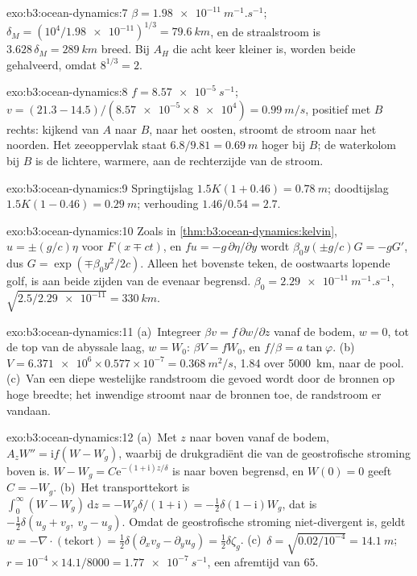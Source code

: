 \begin{solution}{exo:b3:ocean-dynamics:7}
$\beta = \qty{1.98e-11}{m^{-1}.s^{-1}}$; $\delta_M = (10^4/\num{1.98e-11})^{1/3}
= \qty{79.6}{km}$, en de straalstroom is $3.628\,\delta_M = \qty{289}{km}$ breed.
Bij $A_H$ die acht keer kleiner is, worden beide gehalveerd, omdat $8^{1/3} = 2$.
\end{solution}

\begin{solution}{exo:b3:ocean-dynamics:8}
$f = \qty{8.57e-5}{s^{-1}}$; $v = (21.3 - 14.5)/(\num{8.57e-5}\times\num{8e4})
= \qty{0.99}{m/s}$, positief met $B$ rechts: kijkend van $A$ naar $B$,
naar het oosten, stroomt de stroom naar het noorden. Het zeeoppervlak staat
$6.8/9.81 = \qty{0.69}{m}$ hoger bij $B$; de waterkolom bij $B$ is de
lichtere, warmere, aan de rechterzijde van de stroom.
\end{solution}

\begin{solution}{exo:b3:ocean-dynamics:9}
Springtijslag $1.5K(1 + 0.46) = \qty{0.78}{m}$; doodtijslag $1.5K(1 - 0.46)
= \qty{0.29}{m}$; verhouding $1.46/0.54 = 2.7$.
\end{solution}

\begin{solution}{exo:b3:ocean-dynamics:10}
Zoals in \cref{thm:b3:ocean-dynamics:kelvin}, $u = \pm(g/c)\eta$ voor $F(x \mp
ct)$, en $fu = -g\,\partial\eta/\partial y$ wordt $\beta_0y(\pm g/c)G =
-gG'$, dus $G = \exp(\mp\beta_0y^2/2c)$. Alleen het bovenste teken, de
oostwaarts lopende golf, is aan beide zijden van de evenaar begrensd. $\beta_0 =
\qty{2.29e-11}{m^{-1}.s^{-1}}$, $\sqrt{2.5/\num{2.29e-11}} = \qty{330}{km}$.
\end{solution}

\begin{solution}{exo:b3:ocean-dynamics:11}
(a)~Integreer $\beta v = f\,\partial w/\partial z$ vanaf de bodem, $w = 0$,
tot de top van de abyssale laag, $w = W_0$: $\beta V = fW_0$, en $f/\beta =
a\tan\varphi$. (b)~$V = \num{6.371e6}\times0.577\times10^{-7} =
\qty{0.368}{m^2/s}$, \qty{1.84}{\sverdrup} over \qty{5000}{km}, naar de pool.
(c)~Van een diepe westelijke randstroom die gevoed wordt door de bronnen op
hoge breedte; het inwendige stroomt naar de bronnen toe, de randstroom er
vandaan.
\end{solution}

\begin{solution}{exo:b3:ocean-dynamics:12}
(a)~Met $z$ naar boven vanaf de bodem, $A_zW'' = \mathrm if(W - W_g)$, waarbij de
drukgradiënt die van de geostrofische stroming boven is. $W - W_g =
C\mathrm e^{-(1+\mathrm i)z/\delta}$ is naar boven begrensd, en $W(0) = 0$ geeft
$C = -W_g$. (b)~Het transporttekort is $\int_0^\infty(W - W_g)\,\mathrm dz
= -W_g\delta/(1+\mathrm i) = -\tfrac12\delta(1 - \mathrm i)W_g$, dat is
$-\tfrac12\delta(u_g + v_g,\ v_g - u_g)$. Omdat de geostrofische stroming
niet-divergent is, geldt $w = -\nabla\cdot(\text{tekort}) = \tfrac12\delta(\partial_x
v_g - \partial_y u_g) = \tfrac12\delta\zeta_g$. (c)~$\delta =
\sqrt{0.02/10^{-4}} = \qty{14.1}{m}$; $r = 10^{-4}\times14.1/8000 =
\qty{1.77e-7}{s^{-1}}$, een afremtijd van \num{65}.
\end{solution}


